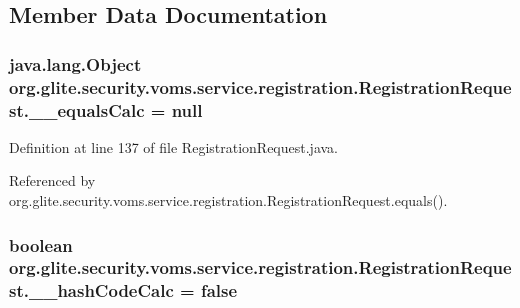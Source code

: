 \subsection{Member Data Documentation}
\hypertarget{classorg_1_1glite_1_1security_1_1voms_1_1service_1_1registration_1_1RegistrationRequest_a9057fc307dd8f0dce02029640539d4a8}{
\subsubsection[{\_\-\_\-equalsCalc}]{\setlength{\rightskip}{0pt plus 5cm}java.lang.Object {\bf org.glite.security.voms.service.registration.RegistrationRequest.\_\-\_\-equalsCalc} = null}}
\label{classorg_1_1glite_1_1security_1_1voms_1_1service_1_1registration_1_1RegistrationRequest_a9057fc307dd8f0dce02029640539d4a8}


Definition at line 137 of file RegistrationRequest.java.



Referenced by org.glite.security.voms.service.registration.RegistrationRequest.equals().

\hypertarget{classorg_1_1glite_1_1security_1_1voms_1_1service_1_1registration_1_1RegistrationRequest_a1afca46aec9466b1762789d7b7fce8ca}{
\subsubsection[{\_\-\_\-hashCodeCalc}]{\setlength{\rightskip}{0pt plus 5cm}boolean {\bf org.glite.security.voms.service.registration.RegistrationRequest.\_\-\_\-hashCodeCalc} = false}}
\label{classorg_1_1glite_1_1security_1_1voms_1_1service_1_1registration_1_1RegistrationRequest_a1afca46aec9466b1762789d7b7fce8ca}


